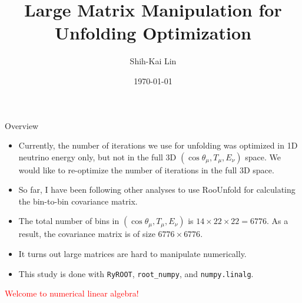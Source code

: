 \documentclass[aspectratio=169]{beamer}
\title{Large Matrix Manipulation for Unfolding Optimization}
\date[today]{\today}
\author{Shih-Kai Lin}
\institute{Colorado State University}
\begin{document}
\begin{frame}
\titlepage
\end{frame}



\begin{frame}{Overview}
  \begin{itemize}
    \item Currently, the number of iterations we use for unfolding was optimized in 1D neutrino energy only, but not in the full 3D $(\cos\theta_\mu,T_\mu,E_\nu)$ space. We would like to re-optimize the number of iterations in the full 3D space.
    \item So far, I have been following other analyses to use RooUnfold for calculating the bin-to-bin covariance matrix.
    \item The total number of bins in $(\cos\theta_\mu,T_\mu,E_\nu)$ is $14\times 22\times 22=6776$. As a result, the covariance matrix is of size $6776\times 6776$.
    \item It turns out large matrices are hard to manipulate numerically.
    \item This study is done with \texttt{RyROOT}, \texttt{root\_numpy}, and \texttt{numpy.linalg}.
  \end{itemize}
  \bigskip
  \centering
  \textcolor{red}{Welcome to numerical linear algebra!}
\end{frame}
\end{document}
